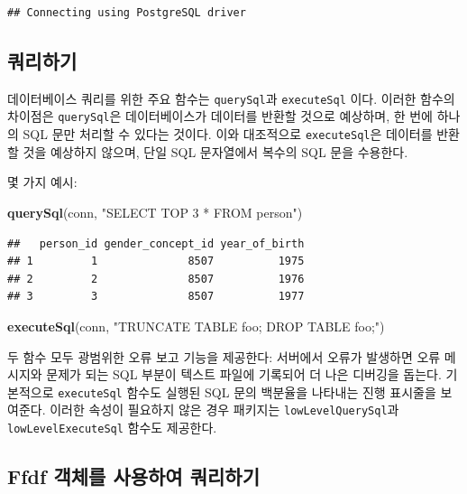\documentclass[10.5pt]{book}
\newenvironment{Shaded}{\begin{snugshade}}{\end{snugshade}}
\newcommand{\KeywordTok}[1]{\textcolor[rgb]{0.13,0.29,0.53}{\textbf{#1}}}
\newcommand{\StringTok}[1]{\textcolor[rgb]{0.31,0.60,0.02}{#1}}
\newcommand{\NormalTok}[1]{#1}
\theoremstyle{definition}
\theoremstyle{definition}
\theoremstyle{definition}
\theoremstyle{remark}
\begin{document}
\begin{verbatim}
## Connecting using PostgreSQL driver
\end{verbatim}

\subsection{쿼리하기}

데이터베이스 쿼리를 위한 주요 함수는 \texttt{querySql}과
\texttt{executeSql} 이다. 이러한 함수의 차이점은 \texttt{querySql}은
데이터베이스가 데이터를 반환할 것으로 예상하며, 한 번에 하나의 SQL 문만
처리할 수 있다는 것이다. 이와 대조적으로 \texttt{executeSql}은 데이터를
반환할 것을 예상하지 않으며, 단일 SQL 문자열에서 복수의 SQL 문을
수용한다. 

몇 가지 예시:

\begin{Shaded}
\begin{Highlighting}[]
\KeywordTok{querySql}\NormalTok{(conn, }\StringTok{"SELECT TOP 3 * FROM person"}\NormalTok{)}
\end{Highlighting}
\end{Shaded}

\begin{verbatim}
##   person_id gender_concept_id year_of_birth
## 1         1              8507          1975
## 2         2              8507          1976
## 3         3              8507          1977
\end{verbatim}

\begin{Shaded}
\begin{Highlighting}[]
\KeywordTok{executeSql}\NormalTok{(conn, }\StringTok{"TRUNCATE TABLE foo; DROP TABLE foo;"}\NormalTok{)}
\end{Highlighting}
\end{Shaded}

두 함수 모두 광범위한 오류 보고 기능을 제공한다: 서버에서 오류가
발생하면 오류 메시지와 문제가 되는 SQL 부분이 텍스트 파일에 기록되어 더
나은 디버깅을 돕는다. 기본적으로 \texttt{executeSql} 함수도 실행된 SQL
문의 백분율을 나타내는 진행 표시줄을 보여준다. 이러한 속성이 필요하지
않은 경우 패키지는 \texttt{lowLevelQuerySql}과
\texttt{lowLevelExecuteSql} 함수도 제공한다.

\subsection{Ffdf 객체를 사용하여 쿼리하기}\label{ffdf---}
\end{document}
